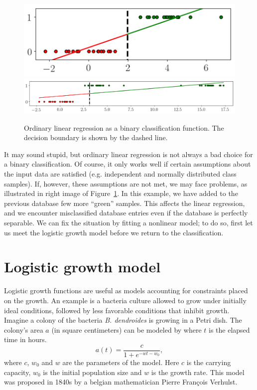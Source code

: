 \documentclass[notitlepage,oneside]{book}
\begin{document}
\begin{figure}[htb]
    \centering
    \includegraphics[width=.305\linewidth]{linear-1d-a.png}
    \includegraphics[width=.64\linewidth]{linear-1d-b.png}
    \caption{Ordinary linear regression as a binary classification function. The decision boundary is shown by the dashed line.}
    \label{fig:linear-regression-classification}
\end{figure}

It may sound stupid, but ordinary linear regression is not always a bad choice for a binary classification.
Of course, it only works well if certain assumptions about the input data are satisfied (e.g. independent and normally distributed class samples).
If, however, these assumptions are not met, we may face problems, as illustrated in right image of Figure~\ref{fig:linear-regression-classification}.
In this example, we have added to the previous database few more ``green'' samples. This affects the linear regression, and we encounter misclassified
database entries even if the database is perfectly separable. We can fix the situation by fitting a nonlinear model; to do so, first let us meet the logistic growth model
before we return to the classification.


\section{Logistic growth model}
\label{sec:logistic-growth}
Logistic growth functions are useful as models accounting for constraints placed on the growth.
An example is a bacteria culture allowed to grow under initially ideal conditions, followed by less favorable conditions that inhibit growth.
Imagine a colony of the bacteria \textit{B. dendroides} is growing in a Petri dish. The colony's area $a$ (in square centimeters) can be modeled by where $t$ is the elapsed time in hours.
\begin{equation}
\label{eq:logistic-growth}
a(t) = \frac{c}{1+e^{-wt - w_0}},
\end{equation}
where $c$, $w_0$ and $w$ are the parameters of the model. Here $c$ is the carrying capacity, $w_0$ is the initial population size and $w$ is the growth rate.
This model was proposed in 1840s by a belgian mathematician Pierre François Verhulst.
\end{document}
